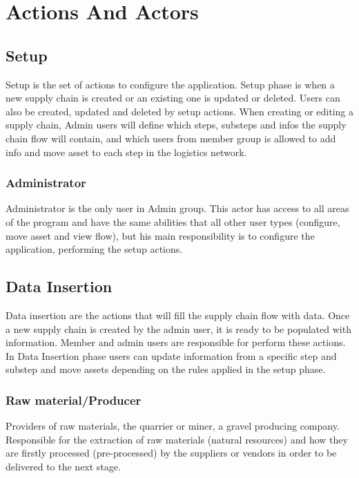 \section{Actions And Actors}\label{sec:actionsAndActors}


\subsection{Setup}\label{sec:Setup}
Setup is the set of actions to configure the application. Setup phase is when a new supply chain is created or an existing one is updated or deleted. Users can also be created, updated and deleted by setup actions. When creating or editing a supply chain, Admin users will define which steps, substeps and infos the supply chain flow will contain, and which users from member group is allowed to add info and move asset to each step in the logistics network.

\subsubsection{Administrator}\label{sec:Administrator}
Administrator is the only user in Admin group. This actor has access to all areas of the program and have the same abilities that all other user types (configure, move asset and view flow), but his main responsibility is to configure the application, performing the setup actions. 



\subsection{Data Insertion}\label{sec:DataInsertion}

Data insertion are the actions that will fill the supply chain flow with data. Once a new supply chain is created by the admin user, it is ready to be populated with information. Member and admin users are responsible for perform these actions. In Data Insertion phase users can update information from a specific step and substep and move assets depending on the rules applied in the setup phase.

\subsubsection{Raw material/Producer}\label{sec:Rawmaterial}
Providers of raw materials, the quarrier or miner, a gravel producing company. Responsible for the extraction of raw materials (natural resources) and how they are firstly processed (pre-processed) by the suppliers or vendors in order to be delivered to the next stage.

